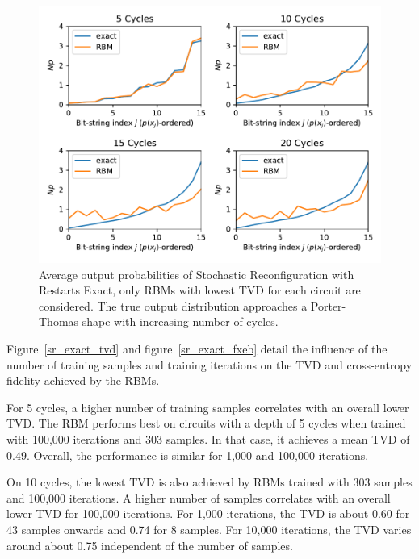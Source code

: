 \begin{figure}[H]
  \centering
  \includegraphics[width=\textwidth]{figures/results/SR-restarts-not-learned/avgBestPDF.pdf}
  \caption[Averaged best performing output probabilities of Stochastic Reconfiguration with Restarts Exact]{
    Average output probabilities of Stochastic Reconfiguration with Restarts Exact, only RBMs with lowest
    TVD for each circuit are considered. The true 
    output distribution approaches a Porter-Thomas shape with increasing number of cycles.}
  \label{fig:sr_exact_bestPDF}
\end{figure}

Figure~\ref{sr_exact_tvd} and figure~\ref{sr_exact_fxeb} detail the influence of the 
number of training samples and training iterations on the TVD and cross-entropy fidelity achieved by 
the RBMs. 

For 5 cycles, a higher number of training samples 
correlates with an overall lower TVD. The RBM performs best on 
circuits with a depth of 5 cycles when trained with 100,000 iterations and 303 samples. In that case, 
it achieves a mean TVD of $0.49$. Overall, the performance is similar for 1,000 and 100,000 iterations.

On 10 cycles, the lowest TVD is also achieved by RBMs trained with 303 samples and 100,000 iterations.
A higher number of samples correlates with an overall lower TVD for 100,000 iterations. For 1,000 iterations, 
the TVD is about 0.60 for 43 samples onwards and 0.74 for 8 samples. For 10,000 iterations, the TVD varies 
around about 0.75 independent of the number of samples. 

